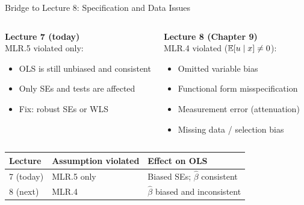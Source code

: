 \documentclass[aspectratio=169, 12pt]{beamer}
\begin{document}
\begin{frame}{Bridge to Lecture 8: Specification and Data Issues}

  \begin{columns}[t]
    \begin{highlightbox}
      \textbf{Lecture 7 (today)} \\
      MLR.5 violated only:
      \begin{itemize}
        \item OLS is still unbiased and consistent
        \item Only SEs and tests are affected
        \item Fix: robust SEs or WLS
      \end{itemize}
    \end{highlightbox}

    \begin{highlightbox}
      \textbf{Lecture 8 (Chapter 9)} \\
      MLR.4 violated ($\operatorname{\mathbb{E}}[u \mid x] \neq 0$):
      \begin{itemize}
        \item Omitted variable bias
        \item Functional form misspecification
        \item Measurement error (attenuation)
        \item Missing data / selection bias
      \end{itemize}
    \end{highlightbox}
  \end{columns}

  \smallskip

  \begin{keybox}
    \small
    \begin{tabular}{lll}
      \toprule
      Lecture & Assumption violated & Effect on OLS \\
      \midrule
      7 (today) & MLR.5 only & Biased SEs; $\hat{\beta}$ consistent \\
      8 (next)  & MLR.4      & $\hat{\beta}$ biased and inconsistent \\
      \bottomrule
    \end{tabular}
  \end{keybox}

\end{frame}

\end{document}
